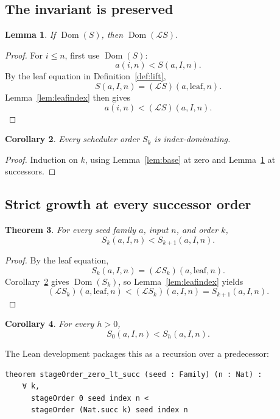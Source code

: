 \documentclass[11pt]{article}
\newtheorem{theorem}{Theorem}[section]
\newtheorem{lemma}[theorem]{Lemma}
\newtheorem{corollary}[theorem]{Corollary}
\theoremstyle{definition}
\theoremstyle{remark}
\newcommand{\Lift}{\mathcal L}
\newcommand{\Idx}{I}
\begin{document}
\subsection{The invariant is preserved}

\begin{lemma}\label{lem:preserve}
If \(\operatorname{Dom}(S)\), then \(\operatorname{Dom}(\Lift S)\).
\end{lemma}
\begin{proof}
For \(i\le n\), first use \(\operatorname{Dom}(S)\):
\[
 a(i,n)<S(a,\Idx,n).
\]
By the leaf equation in Definition~\ref{def:lift},
\[
 S(a,\Idx,n)=(\Lift S)(a,\mathrm{leaf},n).
\]
Lemma~\ref{lem:leafindex} then gives
\[
 a(i,n)<(\Lift S)(a,\Idx,n).
\]
\end{proof}

\begin{corollary}\label{cor:allorders}
Every scheduler order \(S_k\) is index-dominating.
\end{corollary}
\begin{proof}
Induction on \(k\), using Lemma~\ref{lem:base} at zero and
Lemma~\ref{lem:preserve} at successors.
\end{proof}

\subsection{Strict growth at every successor order}

\begin{theorem}\label{thm:step}
For every seed family \(a\), input \(n\), and order \(k\),
\[
 S_k(a,\Idx,n)<S_{k+1}(a,\Idx,n).
\]
\end{theorem}
\begin{proof}
By the leaf equation,
\[
 S_k(a,\Idx,n)=(\Lift S_k)(a,\mathrm{leaf},n).
\]
Corollary~\ref{cor:allorders} gives \(\operatorname{Dom}(S_k)\), so
Lemma~\ref{lem:leafindex} yields
\[
 (\Lift S_k)(a,\mathrm{leaf},n)
 <(\Lift S_k)(a,\Idx,n)=S_{k+1}(a,\Idx,n).
\]
\end{proof}

\begin{corollary}\label{cor:positive}
For every \(h>0\),
\[
 S_0(a,\Idx,n)<S_h(a,\Idx,n).
\]
\end{corollary}
The Lean development packages this as a recursion over a predecessor:
\begin{lstlisting}
theorem stageOrder_zero_lt_succ (seed : Family) (n : Nat) :
    ∀ k,
      stageOrder 0 seed index n <
      stageOrder (Nat.succ k) seed index n
\end{lstlisting}
\end{document}
